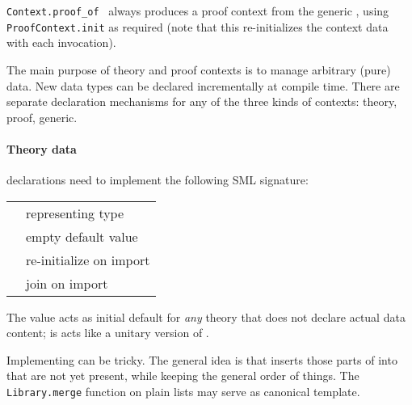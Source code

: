 \begin{isabellebody}
\begin{isamarkuptext}
\begin{description}
  \item \verb|Context.proof_of|~ always produces a
  proof context from the generic , using \verb|ProofContext.init| as required (note that this re-initializes the
  context data with each invocation).

  \end{description}%
\end{isamarkuptext}%
\isamarkuptrue%
%
\endisatagmlref
{\isafoldmlref}%
%
\isadelimmlref
%
\endisadelimmlref
%
\isamarkuptrue%
%
\begin{isamarkuptext}%
The main purpose of theory and proof contexts is to manage
  arbitrary (pure) data.  New data types can be declared incrementally
  at compile time.  There are separate declaration mechanisms for any
  of the three kinds of contexts: theory, proof, generic.

  \paragraph{Theory data} declarations need to implement the following
  SML signature:

  \medskip
  \begin{tabular}{ll}
  \isa{{\isasymtype}\ T} & representing type \\
  \isa{{\isasymval}\ empty{\isacharcolon}\ T} & empty default value \\
  \isa{{\isasymval}\ extend{\isacharcolon}\ T\ {\isasymrightarrow}\ T} & re-initialize on import \\
  \isa{{\isasymval}\ merge{\isacharcolon}\ T\ {\isasymtimes}\ T\ {\isasymrightarrow}\ T} & join on import \\
  \end{tabular}
  \medskip

  \noindent The  value acts as initial default for
  \emph{any} theory that does not declare actual data content;  is acts like a unitary version of .

  Implementing  can be tricky.  The general idea is
  that  inserts those parts of  into  that are not yet present, while
  keeping the general order of things.  The \verb|Library.merge|
  function on plain lists may serve as canonical template.


\end{isamarkuptext}
\end{isabellebody}
